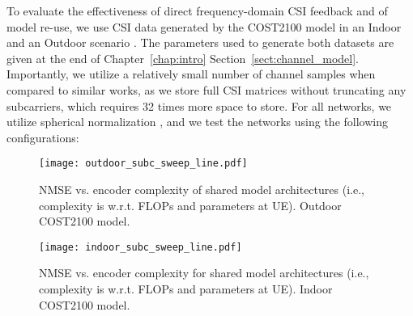 To evaluate the effectiveness of direct frequency-domain CSI feedback and of model re-use, we use CSI data generated by the COST2100 model in an Indoor and an Outdoor scenario \cite{ref:liu2012cost2100}. The parameters used to generate both  datasets are given at the end of Chapter~\ref{chap:intro} Section~\ref{sect:channel_model}. Importantly, we utilize a relatively small number of channel samples when compared to similar works, as we store full CSI matrices without truncating any subcarriers, which requires 32 times more space to store. For all networks, we utilize spherical normalization \cite{ref:liu2020sphnet}, and we test the networks using the following configurations:

\begin{figure}[!hbtp]
    \centering
    \texttt{[image: outdoor\_subc\_sweep\_line.pdf]}
    \caption{NMSE vs. encoder complexity of shared model architectures (i.e., complexity is w.r.t. FLOPs and parameters at UE). Outdoor COST2100 model.}
    \label{fig:outdoor_nmse_vs_complexity}
\end{figure}

\begin{figure}[!hbtp]
    \centering
    \texttt{[image: indoor\_subc\_sweep\_line.pdf]}
    \caption{NMSE vs. encoder complexity for shared model architectures (i.e., complexity is w.r.t. FLOPs and parameters at UE). Indoor COST2100 model.}
    \label{fig:indoor_nmse_vs_complexity}
\end{figure}

